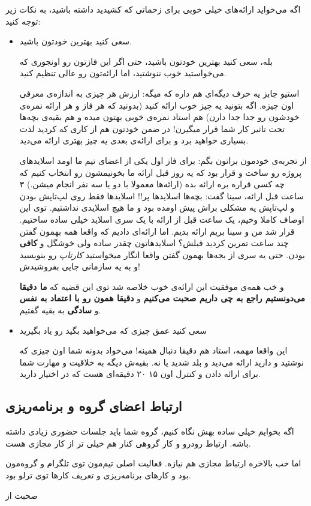 اگه می‌خواید ارائه‌های خیلی خوبی برای زحماتی که کشیدید داشته باشید، به نکات زیر توجه کنید:
\begin{itemize}
	\item 
	{\large سعی کنید بهترین خودتون باشید.}
	
	بله، سعی کنید بهترین خودتون باشید، حتی اگر این فازتون رو اونجوری که می‌خواستید خوب ننوشتید،  اما ارائه‌تون رو عالی تنظیم کنید.
	
	استیو جابز یه حرف دیگه‌ای هم داره که میگه: ارزش هر چیزی به اندازه‌ی معرفی اون چیزه. اگه بتونید یه چیز خوب ارائه کنید (بدونید که هر فاز و هر ارائه نمره‌ی خودشون رو جدا جدا دارن) هم استاد نمره‌ی خوبی بهتون میده و هم بقیه‌ی بچه‌ها تحت تاثیر کار شما قرار میگیرن! در ضمن خودتون هم از کاری که کردید لذت بسیاری خواهید برد و برای ارائه‌ی بعدی یه چیز بهتری ارائه می‌دید.
	
	از تجربه‌ی خودمون براتون بگم: برای فاز اول یکی از اعضای تیم ما اومد اسلاید‌های پروژه رو ساخت و قرار بود که یه روز قبل ارائه ما بخونیمشون رو انتخاب کنیم که چه کسی قراره بره ارائه بده (ارائه‌‌ها معمولا با دو یا سه نفر انجام میشن.) ۳ ساعت قبل ارائه، سینا گفت: بچه‌ها اسلاید‌ها پر!! اسلاید‌ها فقط روی لپ‌تاپش بودن و لپ‌تاپش یه مشکلی براش پیش اومده بود و ما هیچ اسلایدی نداشتیم.
	توی این اوصاف کاملا وخیم، یک ساعت قبل از ارائه با 
	یک سری اسلاید خیلی ساده ساختیم.
	قرار شد من و سینا بریم ارائه بدیم. اما ارائه‌ای دادیم که واقعا همه بهمون گفتن چند ساعت تمرین کردید قبلش؟ اسلاید‌هاتون چقدر ساده ولی خوشگل و \textbf{کافی} بودن.
	حتی یه سری از بجه‌ها بهمون گفتن واقعا انگار میخواستید \textit{کارتاپ} رو بنویسید و به یه سازمانی جایی بفروشیدش!
	
	و خب همه‌ی موفقیت این ارائه‌ی خوب خلاصه شد توی این قضیه که \textbf{ما دقیقا می‌دونستیم راجع به چی داریم صحبت می‌کنیم} و \textbf{دقیقا همون رو با اعتماد به نفس} و \textbf{سادگی} به بقیه گفتیم.
	
	\item 
	{\large سعی کنید عمق چیزی که می‌خواهید بگید رو یاد بگیرید}
	
	این واقعا مهمه، استاد هم دقیقا دنبال همینه! می‌خواد بدونه شما اون چیزی که نوشتید و دارید ارائه می‌دید و بلد شدید یا نه. بقیه‌ش دیگه به خلاقیت و مهارت شما برای ارائه دادن و کنترل اون ۱۵ ۲۰ دقیقه‌ای هست که در اختیار دارید.
	
\end{itemize}

\subsection{ارتباط اعضای گروه و برنامه‌ریزی}
اگه بخوایم خیلی ساده بهش نگاه کنیم، گروه شما باید جلسات حضوری زیادی داشته باشه. ارتباط رودرو و کار گروهی کنار هم خیلی ‌تر از کار مجازی‌ هست.

اما خب بالاخره ارتباط مجازی هم نیازه. فعالیت اصلی تیم‌مون توی تلگرام و گروه‌مون بود و کار‌های برنامه‌ریزی و تعریف کارها توی ترلو بود.


صحبت از 